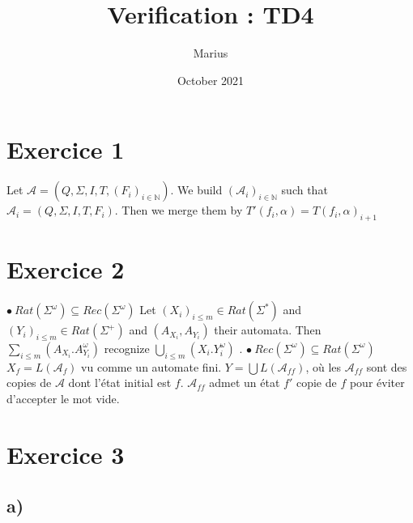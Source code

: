 \documentclass{article}
\title{Verification : TD4}
\author{Marius }
\date{October 2021}
\newcommand{\A}{\mathcal{A}}
\newcommand{\N}{\mathbb{N}}
\begin{document}
\maketitle
\section*{Exercice 1}

Let $\A = (Q,\Sigma,I,T,(F_i)_{i\in\N})$. \newline
We build $(\A_i)_{i \in \N}$ such that $\A_i=(Q,\Sigma,I,T,F_i)$.\newline
Then we merge them by $T'(f_i,\alpha)=T(f_i,\alpha)_{i+1}$ \newline


\section*{Exercice 2}

$\bullet~Rat(\Sigma^\omega) \subseteq Rec(\Sigma^\omega)$\newline
Let $(X_i)_{i \leq m} \in Rat(\Sigma^*)$ and $(Y_i)_{i \leq m} \in Rat(\Sigma^+)$ and $(A_{X_i}, A_{Y_i})$ their automata.
Then $\underset{i\leq m}{\sum} (A_{X_i}.A_{Y_i}^\omega)$ recognize $\underset{i\leq m}{\bigcup} (X_i.Y_i^\omega)$ .\newline
$\bullet~Rec(\Sigma^\omega) \subseteq Rat(\Sigma^\omega)$\newline
$X_f=L(\A_f)$ vu comme un automate fini. $Y= \bigcup L(\A_{ff})$, où les $\A_{ff}$ sont des copies de $\A$ dont l'état initial est $f$. \newline
\color{olive} $\A_{ff}$ admet un état $f'$ copie de $f$ pour éviter d'accepter le mot vide.
\color{black}

\section*{Exercice 3}
\subsection*{a)}
\end{document}
